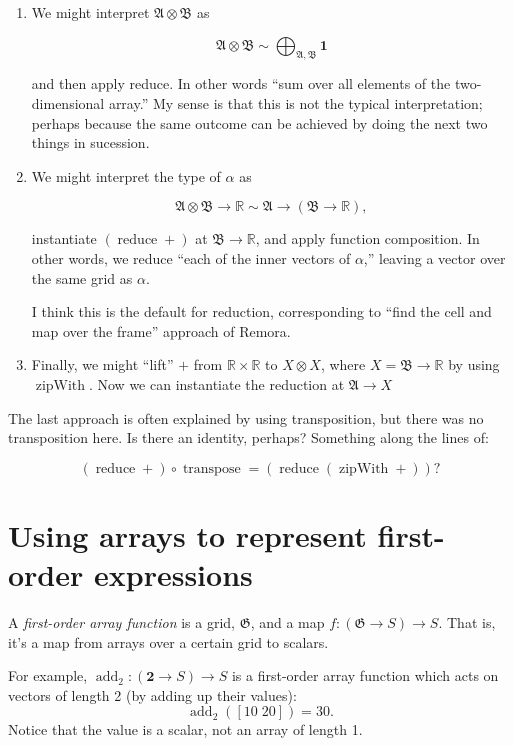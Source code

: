 \documentclass[11pt]{article}
\newcommand{\gr}[1]{\mathfrak{#1}}
\newcommand{\R}{\mathbb{R}}
\newcommand{\unit}{\mathbf{1}}
\DeclareMathOperator{\reduce}{reduce}
\DeclareMathOperator{\zipWith}{zipWith}
\begin{document}
\begin{enumerate}
\item We might interpret \(\gr{A}\otimes\gr{B}\) as 

$$
   \gr{A}\otimes\gr{B} \sim \bigoplus_{\gr{A}, \gr{B}} \unit  
   $$

and then apply reduce. In other words “sum over all elements of the
two-dimensional array.” My sense is that this is not the typical
interpretation; perhaps because the same outcome can be achieved by doing the
next two things in sucession.

\item We might interpret the type of \(\alpha\) as

$$
   \gr{A}\otimes\gr{B}\to\R \sim \gr{A} \to (\gr{B}\to \R),
   $$

instantiate \((\reduce +)\) at \(\gr{B}\to\R\), and apply function
composition. In other words, we reduce “each of the inner vectors of
\(\alpha\),” leaving a vector over the same grid as \(\alpha\).

I think this is the default for reduction, corresponding to “find the cell
and map over the frame” approach of Remora.

\item Finally, we might “lift” \(+\) from \(\R\times \R\) to \(X\otimes X\), where \(X =
   \gr{B}\to\R\) by using \(\zipWith\). Now we can instantiate the reduction at
\(\gr{A}\to X\)
\end{enumerate}

The last approach is often explained by using transposition, but there was no
transposition here. Is there an identity, perhaps? Something along the lines of:

$$
(\reduce +) \circ \operatorname{transpose} = (\reduce (\zipWith +)) ? 
$$

\section{Using arrays to represent first-order expressions}
\label{sec:orgac340af}

A \emph{first-order array function} is a grid, \(\gr{G}\), and a map \(f: (\gr{G}\to
S)\to S\). That is, it's a map from arrays over a certain grid to scalars. 

For example, \(\operatorname{add}_2 : (\mathbf{2}\to S)\to S\) is a first-order
array function which acts on vectors of length 2 (by adding up their values):
$$
\operatorname{add}_2([10\; 20]) = 30.
$$ 
Notice that the value is a scalar, not an array of length 1.
\end{document}
